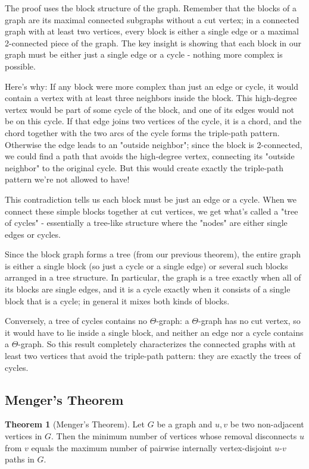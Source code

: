 \documentclass{article}
\theoremstyle{definition}
\newtheorem{theorem}{Theorem}
\begin{document}
The proof uses the block structure of the graph. Remember that the blocks of a graph are its maximal connected subgraphs without a cut vertex; in a connected graph with at least two vertices, every block is either a single edge or a maximal 2-connected piece of the graph. The key insight is showing that each block in our graph must be either just a single edge or a cycle - nothing more complex is possible.

Here's why: If any block were more complex than just an edge or cycle, it would contain a vertex with at least three neighbors inside the block. This high-degree vertex would be part of some cycle of the block, and one of its edges would not be on this cycle. If that edge joins two vertices of the cycle, it is a chord, and the chord together with the two arcs of the cycle forms the triple-path pattern. Otherwise the edge leads to an "outside neighbor"; since the block is 2-connected, we could find a path that avoids the high-degree vertex, connecting its "outside neighbor" to the original cycle. But this would create exactly the triple-path pattern we're not allowed to have!

This contradiction tells us each block must be just an edge or a cycle. When we connect these simple blocks together at cut vertices, we get what's called a "tree of cycles" - essentially a tree-like structure where the "nodes" are either single edges or cycles.

Since the block graph forms a tree (from our previous theorem), the entire graph is either a single block (so just a cycle or a single edge) or several such blocks arranged in a tree structure. In particular, the graph is a tree exactly when all of its blocks are single edges, and it is a cycle exactly when it consists of a single block that is a cycle; in general it mixes both kinds of blocks.

Conversely, a tree of cycles contains no $\Theta$-graph: a $\Theta$-graph has no cut vertex, so it would have to lie inside a single block, and neither an edge nor a cycle contains a $\Theta$-graph. So this result completely characterizes the connected graphs with at least two vertices that avoid the triple-path pattern: they are exactly the trees of cycles.

\subsection{Menger's Theorem}

\begin{theorem}[Menger's Theorem]
Let $G$ be a graph and $u,v$ be two non-adjacent vertices in $G$. Then the minimum number of vertices whose removal disconnects $u$ from $v$ equals the maximum number of pairwise internally vertex-disjoint $u$-$v$ paths in $G$.
\end{theorem}
\end{document}

